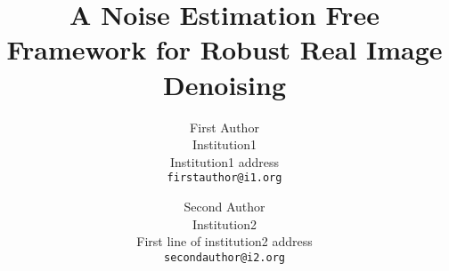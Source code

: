 \documentclass[10pt,twocolumn,letterpaper]{article}
\begin{document}
\title{A Noise Estimation Free Framework for Robust Real Image Denoising}

\author{First Author\\
Institution1\\
Institution1 address\\
{\tt\small firstauthor@i1.org}
\and
Second Author\\
Institution2\\
First line of institution2 address\\
{\tt\small secondauthor@i2.org}
}

\maketitle
\end{document}
